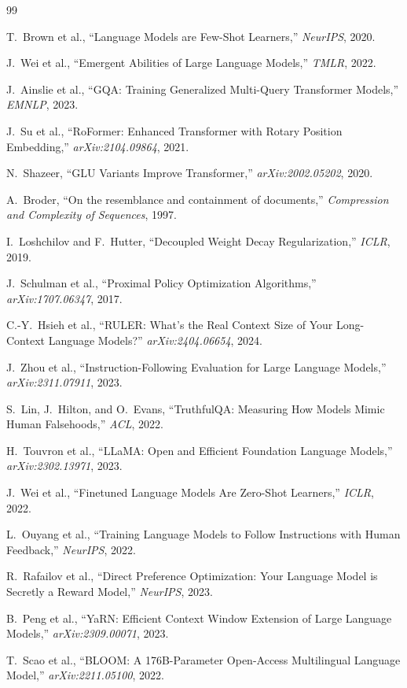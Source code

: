 \documentclass[11pt,a4paper]{article}
\begin{document}
\begin{thebibliography}{99}

T.~Brown et al., ``Language Models are Few-Shot Learners,'' \textit{NeurIPS}, 2020.

J.~Wei et al., ``Emergent Abilities of Large Language Models,'' \textit{TMLR}, 2022.

J.~Ainslie et al., ``GQA: Training Generalized Multi-Query Transformer Models,''
\textit{EMNLP}, 2023.

J.~Su et al., ``RoFormer: Enhanced Transformer with Rotary Position Embedding,''
\textit{arXiv:2104.09864}, 2021.

N.~Shazeer, ``GLU Variants Improve Transformer,'' \textit{arXiv:2002.05202}, 2020.

A.~Broder, ``On the resemblance and containment of documents,'' \textit{Compression and
Complexity of Sequences}, 1997.

I.~Loshchilov and F.~Hutter, ``Decoupled Weight Decay Regularization,'' \textit{ICLR}, 2019.

J.~Schulman et al., ``Proximal Policy Optimization Algorithms,'' \textit{arXiv:1707.06347}, 2017.

C.-Y.~Hsieh et al., ``RULER: What's the Real Context Size of Your Long-Context Language Models?''
\textit{arXiv:2404.06654}, 2024.

J.~Zhou et al., ``Instruction-Following Evaluation for Large Language Models,''
\textit{arXiv:2311.07911}, 2023.

S.~Lin, J.~Hilton, and O.~Evans, ``TruthfulQA: Measuring How Models Mimic Human Falsehoods,''
\textit{ACL}, 2022.

H.~Touvron et al., ``LLaMA: Open and Efficient Foundation Language Models,''
\textit{arXiv:2302.13971}, 2023.

J.~Wei et al., ``Finetuned Language Models Are Zero-Shot Learners,'' \textit{ICLR}, 2022.

L.~Ouyang et al., ``Training Language Models to Follow Instructions with Human Feedback,''
\textit{NeurIPS}, 2022.

R.~Rafailov et al., ``Direct Preference Optimization: Your Language Model is Secretly a Reward
Model,'' \textit{NeurIPS}, 2023.

B.~Peng et al., ``YaRN: Efficient Context Window Extension of Large Language Models,''
\textit{arXiv:2309.00071}, 2023.

T.~Scao et al., ``BLOOM: A 176B-Parameter Open-Access Multilingual Language Model,''
\textit{arXiv:2211.05100}, 2022.

\end{thebibliography}
\end{document}

